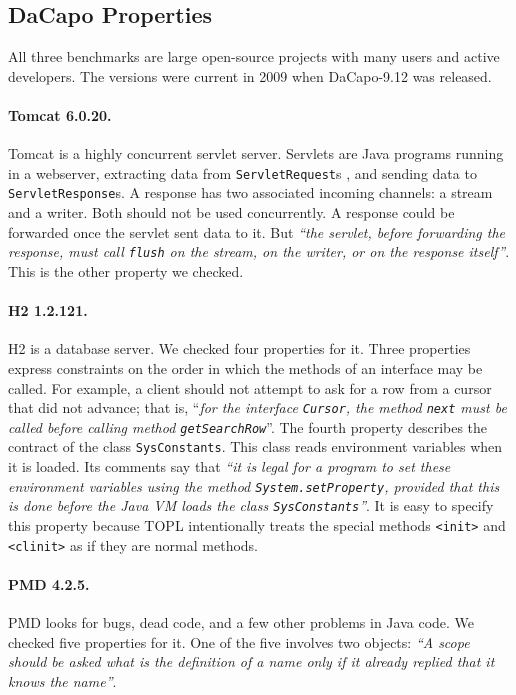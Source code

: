 \documentclass[9pt, preprint]{sigplanconf} %
\theoremstyle{definition}
\theoremstyle{remark}
\begin{document}
\subsection{DaCapo Properties} %

All three benchmarks are large open-source projects with many users and active developers.
The versions were current in 2009 when DaCapo-9.12 was released.

\paragraph{Tomcat 6.0.20.}
Tomcat is a highly concurrent servlet server. 
Servlets are Java programs running in a webserver, extracting data from {\tt ServletRequest}s , and sending data to {\tt ServletResponse}s.
A response has two associated incoming channels: a stream and a writer. Both should not be used concurrently.
A response could be forwarded once the servlet sent data to it.
But {\em ``the servlet, before forwarding the response, must call {\tt flush} on the stream, on the writer, or on the response itself''}.
This is the other property we checked.

\paragraph{H2 1.2.121.}
H2 is a database server.
We checked four properties for it.
Three properties express constraints on the order in which the methods of an interface may be called.
For example, a client should not attempt to ask for a row from a cursor that did not advance;
that is, ``{\em for the interface {\tt Cursor}, the method {\tt next} must be called before calling method {\tt getSearchRow}}''.
The fourth property describes the contract of the class {\tt SysConstants}.
This class reads environment variables when it is loaded.
Its comments say that {\em ``it is legal for a program to set these environment variables using the method {\tt System.setProperty}, provided that this is done before the Java VM loads the class {\tt SysConstants}''}.
It is easy to specify this property because TOPL intentionally treats the special methods {\tt <init>} and {\tt <clinit>} as if they are normal methods.

\paragraph{PMD 4.2.5.}
PMD looks for bugs, dead code, and a few other problems in Java code.
We checked five properties for it.
One of the five involves two objects:
{\em ``A scope should be asked what is the definition of a name only if it already replied that it knows the name''}.
\end{document}
